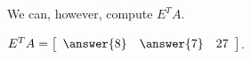 \documentclass{ximera}
\begin{document}
\begin{exercise}
\begin{enumerate}
\begin{problem}
            We can, however, compute $E^TA$.
    
            $E^TA=\startmat{rrr}
                \answer{8} & \answer{7} & 27
            \stopmat$.

        \end{problem}
      
        

    \end{enumerate}
    

\end{exercise}
\end{document}
